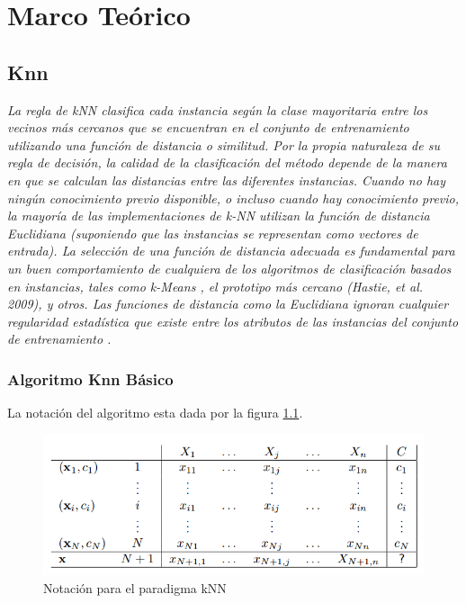 \chapter[Marco Teórico]{\label{ch:marco-teorico}Marco Teórico}

\section{Knn}

\textit{La regla de kNN clasifica cada instancia según la clase mayoritaria entre los vecinos más cercanos que se encuentran en el conjunto de entrenamiento utilizando una función de distancia o similitud. Por la propia naturaleza de su regla de decisión, la calidad de la clasificación del método depende de la manera en que se calculan las distancias entre las diferentes instancias. Cuando no hay ningún conocimiento previo disponible, o incluso cuando hay conocimiento previo, la mayoría de las implementaciones de k-NN utilizan la función de distancia Euclidiana (suponiendo que las instancias se representan como vectores de entrada). La selección de una función de distancia adecuada es fundamental para un buen comportamiento de cualquiera de los algoritmos de clasificación basados en instancias, tales como k-Means \cite{hartigan1979algorithm}, el prototipo más cercano (Hastie, et al. 2009), y otros. Las funciones de distancia como la Euclidiana ignoran cualquier regularidad estadística que existe entre los atributos de las instancias del conjunto de entrenamiento \cite{hastie2009overview}.} \cite[pag. 15]{nguyen2015aprendizaje}

\subsection{Algoritmo Knn Básico}

La notación del algoritmo esta dada por la figura \ref{fig:knnpara}.

\begin{figure}
\begin{center}
   \includegraphics[scale=0.4]{fig/knn_paradigma.png} 
\end{center}
\caption{\label{fig:knnpara}Notación para el paradigma kNN}
\end{figure}

